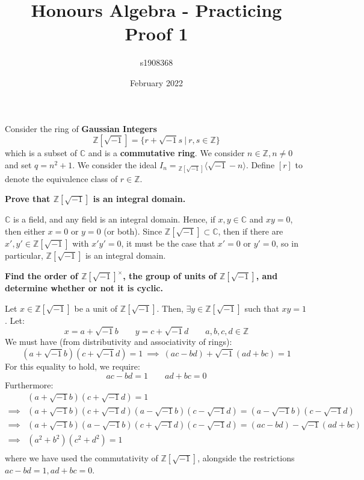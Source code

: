 \documentclass{exam}
\title{Honours Algebra - Practicing Proof 1}
\author{s1908368}
\date{February 2022}
\begin{document}
\maketitle

\renewcommand{\i}{\sqrt{-1}}

Consider the ring of \textbf{Gaussian Integers}
\[
\mathbb{Z}[\i ] = \{r + \i s \ | \ r,s \in \mathbb{Z}\}
\]
which is a subset of $\mathbb{C}$ and is a \textbf{commutative ring}. We consider $n \in \mathbb{Z}, n \neq 0$ and set $q = n^2 + 1$. We consider the ideal $I_n = {}_{\mathbb{Z}[\i]}\langle \i - n \rangle$. Define $[r]$ to denote the equivalence class of $r \in \mathbb{Z}$.

\begin{questions}

\question \textbf{Prove that $\mathbb{Z}[\i]$ is an integral domain.}

$\mathbb{C}$ is a field, and any field is an integral domain. Hence, if $x,y \in \mathbb{C}$ and $xy = 0$, then either $x = 0$ or $y = 0$ (or both). Since $\mathbb{Z}[\i] \subset \mathbb{C}$, then if there are $x',y' \in \mathbb{Z}[\i]$ with $x'y' = 0$, it must be the case that $x' = 0$ or $y' = 0$, so in particular, $\mathbb{Z}[\i]$ is an integral domain.

\question \textbf{Find the order of $\mathbb{Z}[\i]^\times$, the group of units of $\mathbb{Z}[\i]$, and determine whether or not it is cyclic.}

Let $x \in \mathbb{Z}[\i]$ be a unit of $\mathbb{Z}[\i]$. Then, $\exists y \in \mathbb{Z}[\i]$ such that $xy = 1$. Let:
\[
x = a + \i b \qquad y = c + \i d \qquad a,b,c,d \in \mathbb{Z}
\]
We must have (from distributivity and associativity of rings):
\[
(a + \i b)(c + \i d) = 1 \ \implies \ (ac - bd) + \i(ad + bc) = 1
\]
For this equality to hold, we require:
\[
ac - bd = 1 \qquad ad + bc = 0
\]
Furthermore:
\begin{align*}
    &(a + \i b)(c + \i d) = 1 \\
    \implies & (a + \i b)(c + \i d)(a - \i b)(c - \i d) = (a - \i b)(c - \i d) \\
    \implies & (a + \i b)(a - \i b)(c + \i d)(c - \i d) = (ac - bd) - \i(ad + bc) \\
    \implies & (a^2 + b^2)(c^2 + d^2) = 1 \\
\end{align*}
where we have used the commutativity of $\mathbb{Z}[\i]$, alongside the restrictions $ac - bd = 1, ad + bc = 0$.

\smallskip


\end{questions}
\end{document}
